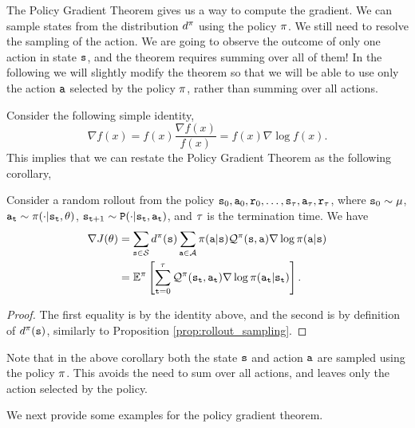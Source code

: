 The Policy Gradient Theorem gives us a way to compute the gradient.
We can sample states from the distribution $d^{\pi}$ using the
policy $\pi$. We still need to resolve the sampling of the
action. We are going to observe the outcome of only one action in
state ${\tt s}$, and the theorem requires summing over all of them!
In the following we will slightly modify the theorem so that we will
be able to use only the action ${\tt a}$ selected by the policy
$\pi$, rather than summing over all actions.

Consider the following simple identity,
\begin{equation}\label{eq:log_likelihood_trick}
\nabla f(x)=f(x)\frac{\nabla f(x)}{f(x)}=f(x)\nabla \log f(x).
\end{equation}
This implies that we can restate the Policy Gradient Theorem as the
following corollary,
\begin{corollary} 
\label{thm:policy-gradient-corr} Consider a random rollout from the policy ${\tt s}_0,{\tt a}_0,{\tt r}_0,\dots,{\tt s}_\tau, {\tt a}_\tau, {\tt r}_\tau$, where ${\tt s}_0 \sim \mu$, ${\tt a}_{\tt t}\sim \pi(\cdot|{\tt s}_{\tt t},\theta)$, ${\tt s}_{{\tt t}+1} \sim {\tt P} (\cdot | {\tt s}_{\tt t}, {\tt a}_{\tt t})$, and $\tau$ is the termination time. We have
\begin{equation*}
\begin{split}
\nabla J(\theta) &= \sum_{{\tt s} \in \mathcal{S}} d^{\pi}({\tt s}) \sum_{{\tt a}\in
\mathcal{A}} \pi({\tt a}|{\tt s}) \mathcal{Q}^\pi
({\tt s},{\tt a}) \nabla \log \pi({\tt a}|{\tt s}) \\
&=\mathbb{E}^\pi\left[\sum_{{\tt t}=0}^{\tau}\mathcal{Q}^\pi ({\tt s}_{\tt t},{\tt a}_{\tt t})\nabla \log
\pi({\tt a}_{\tt t}|{\tt s}_{\tt t})\right].    
\end{split}
\end{equation*}
\end{corollary}
\begin{proof}
    The first equality is by the identity above, and the second is by definition of $d^{\pi}({\tt s})$, similarly to Proposition \ref{prop:rollout_sampling}.
\end{proof}
Note that in the above corollary both the state ${\tt s}$ and action
${\tt a}$ are sampled using the policy $\pi$. This avoids the need to sum over all actions, and leaves only the action selected by the policy.

We next provide some examples for the policy gradient theorem.


